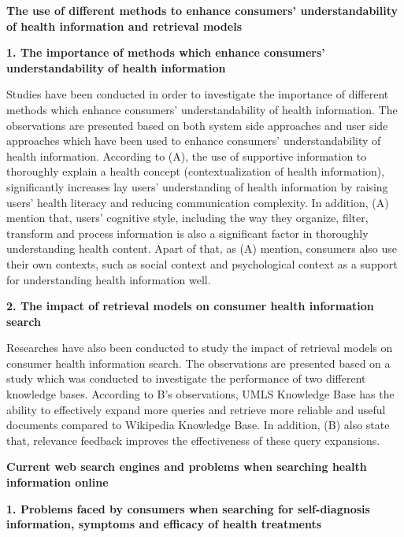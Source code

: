 \documentclass[]{article}
\begin{document}
\textbf{The use of different methods to enhance consumers' understandability of health information and retrieval models}


\textbf{1. The importance of methods which enhance consumers' understandability of health information}

Studies have been conducted in order to investigate the importance of different methods which enhance consumers' understandability of health information. The observations are presented based on both system side approaches and user side approaches which have been used to enhance consumers' understandability of health information. According to (A), the use of supportive information to thoroughly explain a health concept (contextualization of health information), significantly increases lay users' understanding of health information by raising users' health literacy and reducing communication complexity. In addition, (A) mention that, users' cognitive style, including the way they organize, filter, transform and process information is also a significant factor in thoroughly understanding health content. Apart of that, as (A) mention, consumers also use their own contexts, such as social context and psychological context as a support for understanding health information well.        


\textbf{2. The impact of retrieval models on consumer health information search} 


Researches have also been conducted to study the impact of retrieval models on consumer health information search. The observations are presented based on a study which was conducted to investigate the performance of two different knowledge bases. According to B's observations, UMLS Knowledge Base has the ability to effectively expand more queries and retrieve more reliable and useful documents compared to Wikipedia Knowledge Base. In addition, (B) also state that, relevance feedback improves the effectiveness of these query expansions.    
	
\textbf{Current web search engines and problems when searching health information online}

\textbf{1. Problems faced by consumers when searching for self-diagnosis information, symptoms and efficacy of health treatments}
\end{document}
